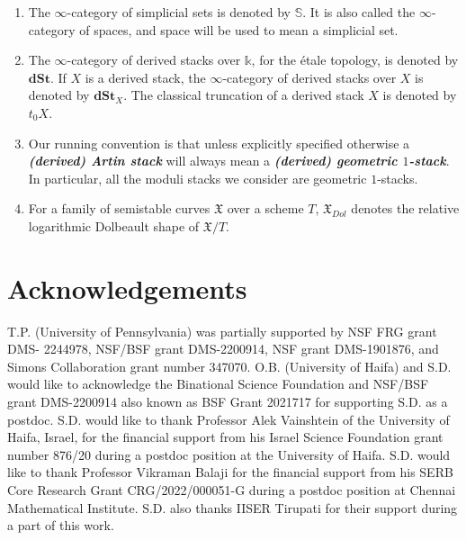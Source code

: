 \documentclass[11pt]{amsart}
\theoremstyle{plain}
\numberwithin{equation}{section}
\theoremstyle{definition}
\theoremstyle{plain}
\begin{document}
\begin{enumerate}
\item[$\bullet$] The $\infty$-category of simplicial sets is denoted by $\mathbb{S}$. It is also called the $\infty$-category of spaces, and space will be used to mean a simplicial set.

\item[$\bullet$] The $\infty$-category of derived stacks over $\mathbb k$, for the \'{e}tale topology, is denoted by $\textbf{dSt}$. If $X$ is a derived stack, the $\infty$-category of derived stacks over $X$ is denoted by $\textbf{dSt}_X$. The classical truncation of a derived stack $X$ is denoted by $t_0 X$.

\item[$\bullet$] Our running convention is that unless explicitly specified otherwise a \linebreak \emph{\bfseries (derived)  Artin stack} will always mean a \emph{\bfseries (derived) geometric 
$1$-stack}. In particular, all the moduli stacks we consider are geometric $1$-stacks.

\item[$\bullet$] For a family of semistable curves $\mathfrak X$ over a scheme $T$, $\mathfrak X_{Dol}$ denotes the relative logarithmic Dolbeault shape of $\mathfrak X/T$.
\begin{center}
\end{center}

\end{enumerate}
\section{\textbf{Acknowledgements}}
T.P. (University of Pennsylvania) was partially supported by NSF FRG grant DMS-
2244978, NSF/BSF grant DMS-2200914, NSF grant DMS-1901876, and Simons Collaboration grant number 347070. O.B. (University of Haifa) and S.D. would like to acknowledge the Binational Science Foundation and NSF/BSF grant DMS-2200914 also known as BSF Grant 2021717 for supporting S.D. as a postdoc. S.D. would like to thank Professor Alek Vainshtein of the University of Haifa, Israel, for the financial support from his Israel Science Foundation grant number 876/20 during a postdoc position at the University of Haifa. S.D. would like to thank Professor Vikraman Balaji for the financial support from his SERB Core Research Grant CRG/2022/000051-G during a postdoc position at Chennai Mathematical Institute. S.D. also thanks IISER Tirupati for their support during a part of this work. 
\end{document}
